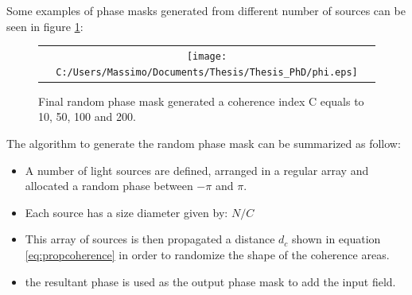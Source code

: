 Some examples of phase masks generated from different number of sources can be seen in figure \ref{fig:phasemask3}:
\begin{figure}[H]
	\begin{center}
		\begin{tabular}{c}
			\texttt{[image: C:/Users/Massimo/Documents/Thesis/Thesis\_PhD/phi.eps]}
		\end{tabular}
	\end{center}
	\caption{ \label{fig:phasemask3} 
		Final random phase mask generated a coherence index C equals to 10, 50, 100 and 200. }
\end{figure} 
The algorithm to generate the random phase mask can be summarized as follow:
\begin{itemize}
\item A number of light sources are defined, arranged in a regular array and allocated a random phase between $-\pi$ and $\pi$. 
 \item Each source has a size diameter given by: $N/C$
 \item This array of sources is then propagated a distance $d_c$ shown in equation \ref{eq:propcoherence} in order to randomize the shape of the coherence areas.
 \item the resultant phase is used as the output phase mask to add the input field.
\end{itemize}
\newpage
